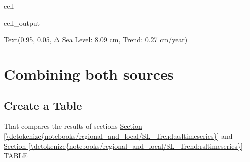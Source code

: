 \documentclass[letterpaper,10pt,english]{jupyterBook}
\begin{document}
\begin{sphinxuseclass}{cell}
\begin{sphinxVerbatimOutput}
\begin{sphinxuseclass}{cell_output}
\begin{sphinxVerbatim}[commandchars=\\\{\}]
Text(0.95, 0.05, \PYGZsq{}Δ Sea Level: 8.09 cm, Trend: 0.27 cm/year\PYGZsq{})
\end{sphinxVerbatim}

\noindent{}

\end{sphinxuseclass}\end{sphinxVerbatimOutput}

\end{sphinxuseclass}

\part{Combining both sources}
\label{\detokenize{notebooks/regional_and_local/SL_Trend:combining-both-sources}}

\chapter{Create a Table}
\label{\detokenize{notebooks/regional_and_local/SL_Trend:create-a-table}}\label{\detokenize{notebooks/regional_and_local/SL_Trend:id3}}
\sphinxAtStartPar
That compares the results of sections \hyperref[\detokenize{notebooks/regional_and_local/SL_Trend:asltimeseries}]{Section \ref{\detokenize{notebooks/regional_and_local/SL_Trend:asltimeseries}}} and \hyperref[\detokenize{notebooks/regional_and_local/SL_Trend:rsltimeseries}]{Section \ref{\detokenize{notebooks/regional_and_local/SL_Trend:rsltimeseries}}}– TABLE
\end{document}
